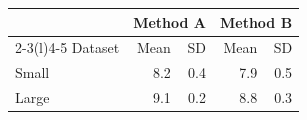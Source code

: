 \documentclass{article}
\begin{document}
\begin{tabular}{lrrrr}
\toprule
& \multicolumn{2}{c}{Method A} & \multicolumn{2}{c}{Method B} \\
\cmidrule(lr){2-3}\cmidrule(l){4-5}
Dataset & Mean & SD & Mean & SD \\
\midrule
Small & 8.2 & 0.4 & 7.9 & 0.5 \\
Large & 9.1 & 0.2 & 8.8 & 0.3 \\
\bottomrule
\end{tabular}
\end{document}
